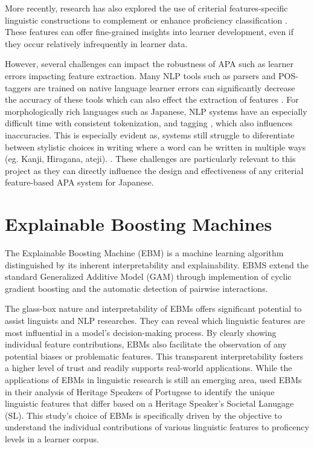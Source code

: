 More recently, research has also explored the use of criterial features-specific linguistic constructions to
complement or enhance proficiency classification
\citep{Hawkins_Buttery_2010,tono2013,tono2018,defino2022, Kim2021}. These features can offer fine-grained insights into
learner development, even if they occur relatively infrequently in learner data.


However, several challenges can impact the robustness of APA such as learner errors impacting feature extraction. Many
NLP tools such as parsers and POS-taggers are trained on native language learner errors can
significantly decrease the accuracy of these tools which can also effect the extraction of features
\citep{Meurers_2015,Meurers2017}.
For morphologically rich languages such as Japanese, NLP systems have an especially difficult time with consistent
tokenization, and tagging , which also influences inaccuracies. This is especially evident as, systems still struggle to diferentiate
between stylistic choices in writing where a word can be written in multiple ways (eg. Kanji, Hiragana, ateji).
\citep{halpern2000challenges,izutsu2021}. These
challenges are particularly
relevant to
this
project as they can directly influence the design and effectiveness of any criterial feature-based APA system for
Japanese.


\section{Explainable Boosting Machines}
The Explainable Boosting Machine (EBM)\citet{nori2019} is a machine learning algorithm distinguished by its
inherent
interpretability and explainability. EBMS extend the standard Generalized Additive Model (GAM) through implemention of
cyclic
gradient boosting and the automatic detection of pairwise interactions.

The glass-box nature and interpretability of EBMs offers significant potential to assist linguists and NLP
researches. They can reveal
which linguistic
features are
most influential in a model's decision-making process. By clearly showing individual feature contributions, EBMs
also facilitate the observation of any potential biases or problematic features. This transparent interpretability
fosters a higher level of trust and readily supports real-world applications.
While the applications of EBMs in linguistic research is still an emerging area, \citet{akef2025} used EBMs in their
analysis of
Heritage Speakers of Portugese to identify the unique linguistic features that differ based on a Heritage Speaker's
Societal Lanugage (SL). This study's choice of EBMs is specifically driven by the objective to understand the
individual contributions of various linguistic features to proficency levels in a learner corpus.